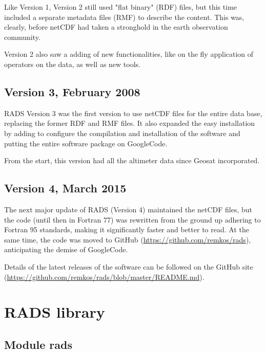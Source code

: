\documentclass[a4paper,11pt,openany,natbib,nomargin]{thesis}
\begin{document}
Like Version 1, Version 2 still used "flat binary" (RDF) files, but this time included a separate metadata files (RMF) to describe the content.
This was, clearly, before netCDF had taken a stronghold in the earth observation community.

Version 2 also saw a adding of new functionalities, like on the fly application of operators on the data, as well as new tools.

\section{Version 3, February 2008}
RADS Version 3 was the first version to use netCDF files for the entire data base, replacing the former RDF and RMF files. It also expanded the easy installation by adding  to configure the compilation and installation of the software and putting the entire software package on GoogleCode.

From the start, this version had all the altimeter data since Geosat incorporated.

\section{Version 4, March 2015}
The next major update of RADS (Version 4) maintained the netCDF files, but the code (until then in Fortran 77) was rewritten from the ground up adhering to Fortran 95 standards, making it significantly faster and better to read. At the same time, the code was moved to GitHub (\url{https://github.com/remkos/rads}), anticipating the demise of GoogleCode.

Details of the latest releases of the software can be followed on the GitHub site (\url{https://github.com/remkos/rads/blob/master/README.md}).


\chapter{RADS library}
\label{app:library}
\section{Module rads}
\verbatimfont{\tiny}



\printindex
\end{document}
